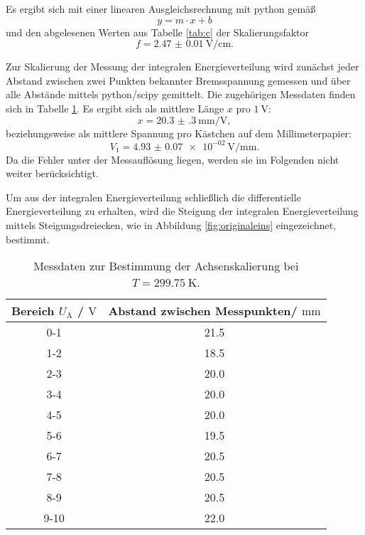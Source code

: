 Es ergibt sich mit einer linearen Ausgleichsrechnung mit python \cite{python} gemäß
\begin{equation*}
	y = m \cdot x + b
\end{equation*}
und den abgelesenen Werten aus Tabelle \ref{tab:c} der Skalierungsfaktor 
\begin{equation*}
	f = \SI{2.47(1)}{\volt\per\centi\meter} \mathrm{.}
\end{equation*}

Zur Skalierung der Messung der integralen Energieverteilung wird zunächst jeder Abstand zwischen zwei Punkten bekannter Bremsspannung gemessen und über alle Abstände mittels python/scipy \cite{scipy} gemittelt.
Die zugehörigen Messdaten finden sich in Tabelle \ref{tab:skalaa}.
Es ergibt sich als mittlere Länge $x$ pro $\SI{1}{\volt}$:
\begin{equation}
	x=\SI{20.3(3)}{\milli\meter\per\volt} \mathrm{,}
\end{equation}
beziehungsweise als mittlere Spannung pro Kästchen auf dem Millimeterpapier:
\begin{equation}
	V_1= \SI{4.93(7)e-02}{\volt\per\milli\meter} \mathrm{.}
\end{equation}
Da die Fehler unter der Messauflösung liegen, werden sie im Folgenden nicht weiter berücksichtigt.

Um aus der integralen Energieverteilung schließlich die differentielle Energieverteilung zu erhalten, wird die Steigung der integralen Energieverteilung mittels Steigungsdreiecken, wie in Abbildung \ref{fig:originaleins} eingezeichnet, bestimmt.


\begin{table}
	\centering
	\caption{Messdaten zur Bestimmung der Achsenskalierung bei $T=\SI{299.75}{\kelvin}$.}
	\label{tab:skalaa}
	\begin{tabular}{cc}
		\toprule
		Bereich $U_{\mathrm{A}}$ / $\si{\volt}$ & Abstand zwischen Messpunkten/ $\si{\milli\meter}$ \\
		\midrule
		0-1 & 21.5 \\
		1-2 & 18.5 \\
		2-3 & 20.0 \\
		3-4 & 20.0 \\
		4-5 & 20.0 \\
		5-6 & 19.5 \\
		6-7 & 20.5 \\
		7-8 & 20.5 \\
		8-9 & 20.5 \\
		9-10 & 22.0 \\
		\bottomrule
	\end{tabular}
\end{table}
\FloatBarrier
